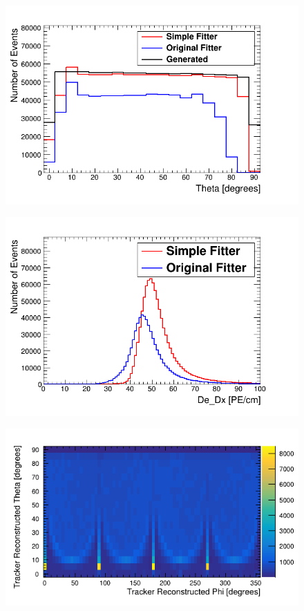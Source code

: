 \begin{figure}[H]
 \centering
 \includegraphics[width=0.8\linewidth]{Chapter5/Figs/Raster/thetaComarison.png}
 \label{fig:thetaGenVsRecoHem}
\end{figure}

\begin{figure}[H]
 \centering
 \includegraphics[width=0.8\linewidth]{Chapter5/Figs/Raster/dedxComarison.png}
 \label{fig:dedxGenVsRecoHem}
\end{figure}

\begin{figure}[H]
 \centering
 \includegraphics[width=0.8\linewidth]{Chapter5/Figs/Raster/phi_vs_theta_hem_simNoDead.png}
 \label{fig:simulatedHemisphereDist}
\end{figure}

